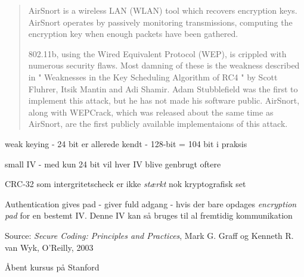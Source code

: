 \documentclass[20pt,landscape,a4paper,footrule]{foils}
\begin{document}




\begin{quote}
AirSnort is a wireless LAN (WLAN) tool which recovers encryption
keys. AirSnort operates by passively monitoring transmissions,
computing the encryption key when enough packets have been gathered.

802.11b, using the Wired Equivalent Protocol (WEP), is crippled with
numerous security flaws. Most damning of these is the weakness
described in " Weaknesses in the Key Scheduling Algorithm of RC4 "
by Scott Fluhrer, Itsik Mantin and Adi Shamir. Adam Stubblefield
was the first to implement this attack, but he has not made his
software public. AirSnort, along with WEPCrack, which was released
about the same time as AirSnort, are the first publicly available
implementaions of this attack.  
\end{quote}



\begin{list1}
\item weak keying - 24 bit er allerede kendt - 128-bit = 104 bit i praksis
\item small IV - med kun 24 bit vil hver IV blive genbrugt oftere
\item CRC-32 som intergritetscheck er ikke \emph{stærkt} nok
  kryptografisk set
\item Authentication gives pad - giver fuld adgang - hvis der bare
  opdages \emph{encryption pad} for en bestemt IV. Denne IV kan så
  bruges til al fremtidig kommunikation
\end{list1}
Source:
\emph{Secure Coding: Principles and Practices}, Mark G. Graff
  og Kenneth R. van Wyk, O'Reilly, 2003



Åbent kursus på Stanford\\
\end{document}
